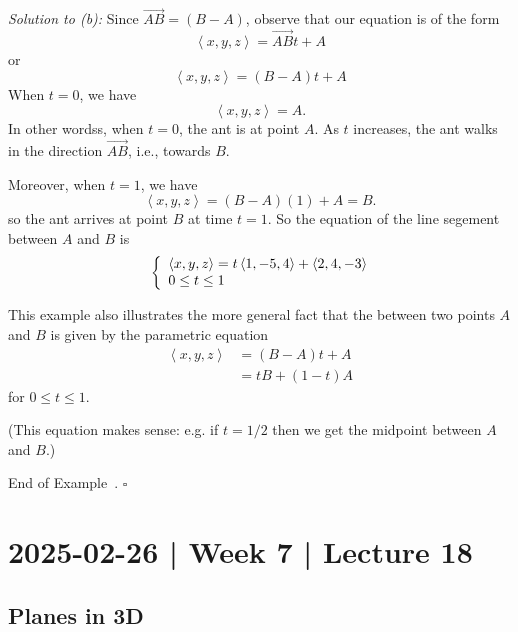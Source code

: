 \documentclass[10pt]{article}
\theoremstyle{definition}
\newtheorem{example}[theorem]{Example}
\renewenvironment{example}
{\begin{oldexample}}
  {\par\smallskip\hfill   End of Example~\theexample. $\square$    \par\end{oldexample}}
\newcommand{\1}[1]{\textbf{1}_{\left[#1\right]}} %
\newcommand{\dempfcolor}[1]{{\color{RoyalBlue}#1}}
\newcommand{\demph}[1]{\dempfcolor{{\sl #1}}}
\begin{document}
\begin{example}
  \textit{Solution to (b):} Since $\overrightarrow{AB}=(B-A)$, observe that our
  equation is of the form
  \begin{equation*}
    \left\langle x,y,z \right\rangle  = \overrightarrow{AB}t+A
  \end{equation*}
  or
  \begin{equation*}
    \left\langle x,y,z \right\rangle  = (B-A)t+A
  \end{equation*}
  When $t=0$, we have
  \begin{equation*}
    \left\langle x,y,z \right\rangle =A.
  \end{equation*}
  In other wordss, when $t=0$, the ant is at point $A$. As $t$ increases, the
  ant walks in the direction $\overrightarrow{AB}$, i.e., towards $B$.

  Moreover, when $t=1$, we have
  \begin{equation*}
    \left\langle x,y,z \right\rangle= (B-A)(1)+A = B.
  \end{equation*}
  so the ant arrives at point $B$ at time $t=1$.
  So the equation of the line segement between $A$ and $B$ is
  \begin{equation*}
    \left\{ \begin{array}{l@{}l}
        \left\langle x,y,z \right\rangle
        = t \left\langle 1,-5,4 \right\rangle
        + \left\langle 2,4,-3 \right\rangle  \\
        0 \leq t \leq 1
      \end{array}\right.
  \end{equation*}

  This example also illustrates the more general fact that the \demph{line
    segment} between two points $A$ and $B$ is given by the parametric equation
  \begin{align*}
    \left\langle x,y,z \right\rangle 
    &= (B-A)t+A\\
    &= tB+(1-t)A
  \end{align*}
  for $0 \leq t \leq 1$.

  (This equation makes sense: e.g. if $t=1/2$ then we get the midpoint between
  $A$ and $B$.)
\end{example}

\newpage
\section{2025-02-26 | Week 7 | Lecture 18}
\subsection{Planes in 3D}
\end{document}
